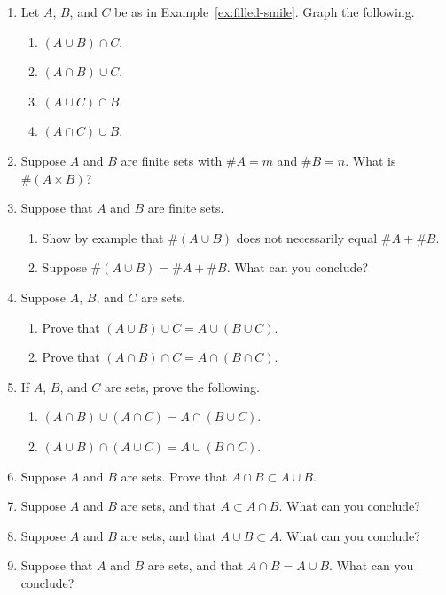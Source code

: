 \begin{enumerate}
  \item Let $A$, $B$, and $C$ be as in Example~\ref{ex:filled-smile}. Graph the following.
\begin{enumerate}
    \item $(A \cup B) \cap C$.
    \item $(A \cap B) \cup C$.
    \item $(A \cup C) \cap B$.
    \item $(A \cap C) \cup B$.
\end{enumerate}

  \item Suppose $A$ and $B$ are finite sets with $\# A = m$ and $\# B = n$. What is $\# (A \times B)$?

  \item Suppose that $A$ and $B$ are finite sets.
\begin{enumerate}
    \item Show by example that $\# (A \cup B)$ does not necessarily equal $\# A + \# B$.
    \item Suppose $\# (A \cup B) = \# A + \# B$. What can you conclude?
\end{enumerate}

  \item Suppose $A$, $B$, and $C$ are sets.
\begin{enumerate}
    \item Prove that $(A \cup B) \cup C = A \cup (B \cup C)$.
    \item Prove that $(A \cap B) \cap C = A \cap (B \cap C)$.
\end{enumerate}

  \item If $A$, $B$, and $C$ are sets, prove the following.
\begin{enumerate}
    \item $(A \cap B) \cup (A \cap C) = A \cap (B \cup C)$.
    \item $(A \cup B) \cap (A \cup C) = A \cup (B \cap C)$.
\end{enumerate}


  \item Suppose $A$ and $B$ are sets. Prove that $A \cap B \subset A \cup B$.

  \item Suppose $A$ and $B$ are sets, and that $A \subset A \cap B$. What can you conclude?

  \item Suppose $A$ and $B$ are sets, and that $A \cup B \subset A$. What can you conclude?

  \item Suppose that $A$ and $B$ are sets, and that $A \cap B = A \cup B$. What can you conclude?

\end{enumerate}

